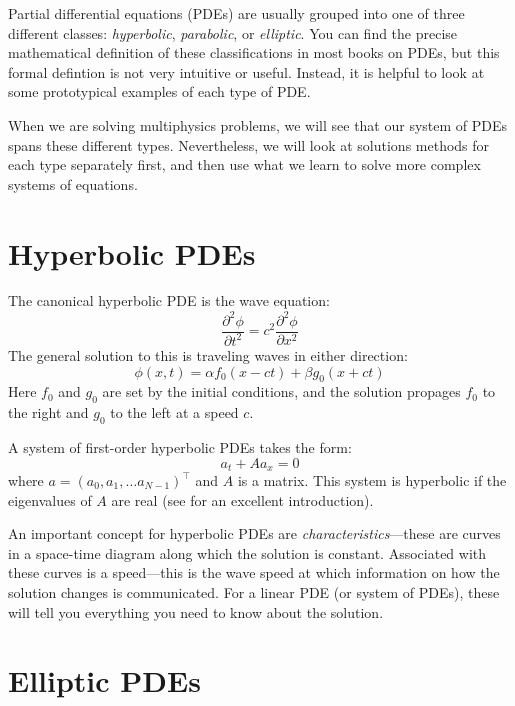 Partial differential equations (PDEs) are usually grouped into one of
three different classes: {\em hyperbolic}, {\em parabolic}, or {\em
  elliptic}.  You can find the precise mathematical definition of
these classifications in most books on PDEs, but this formal defintion
is not very intuitive or useful.  Instead, it is helpful to look at
some prototypical examples of each type of PDE.

When we are solving multiphysics problems, we will see that our 
system of PDEs spans these different types.  Nevertheless, we will
look at solutions methods for each type separately first, and then
use what we learn to solve more complex systems of equations.

\section{Hyperbolic PDEs}

The canonical hyperbolic PDE is the wave equation:
\begin{equation}
  \frac{\partial^2 \phi}{\partial t^2} = c^2 \frac{\partial^2 \phi}{\partial x^2}
\end{equation}   
The general solution to this is traveling waves in either direction:
\begin{equation}
  \phi(x,t) = \alpha f_0(x - ct) + \beta g_0(x + ct)
\end{equation}
Here $f_0$ and $g_0$ are set by the initial
conditions, and the solution propages $f_0$ to the right and $g_0$ to
the left at a speed $c$.

A system of first-order hyperbolic PDEs takes the form:
\begin{equation}
a_t + A a_x = 0
\end{equation}
where $a = (a_0, a_1, \ldots a_{N-1})^\intercal$ and $A$ is a matrix.
This system is hyperbolic if the eigenvalues of $A$ are real (see
\cite{leveque:2002} for an excellent introduction).

An important concept for hyperbolic PDEs are {\em
  characteristics}---these are curves in a space-time diagram along
which the solution is constant.  Associated with these curves is a
speed---this is the wave speed at which information on how the
solution changes is communicated.  For a linear PDE (or system of
PDEs), these will tell you everything you need to know about the
solution.


\section{Elliptic PDEs}

